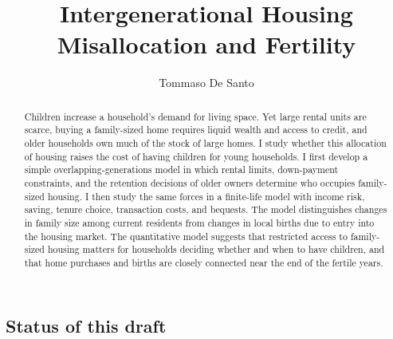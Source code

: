 \documentclass[11pt]{article}
\title{Intergenerational Housing Misallocation and Fertility}
\author{Tommaso De Santo}
\date{}
\theoremstyle{definition}
\newcommand{\1}{\mathbf 1}
\begin{document}
\maketitle

\begin{abstract}
Children increase a household's demand for living space. Yet large rental
units are scarce, buying a family-sized home requires liquid wealth and access
to credit, and older households own much of the stock of large homes. I study
whether this allocation of housing raises the cost of having children for
young households. I first develop a simple overlapping-generations model in
which rental limits, down-payment constraints, and the retention decisions of
older owners determine who occupies family-sized housing. I then study the
same forces in a finite-life model with income risk, saving, tenure choice,
transaction costs, and bequests. The model distinguishes changes in family
size among current residents from changes in local births due to entry into the
housing market. The quantitative model suggests that restricted access to
family-sized housing matters for households deciding whether and when to have
children, and that home purchases and births are closely connected near the
end of the fertile years.
\end{abstract}

\subsection*{Status of this draft}
\end{document}

